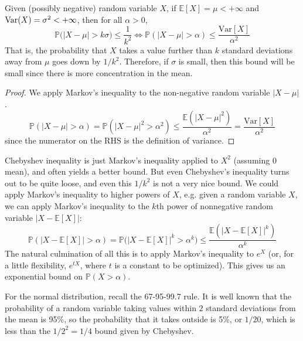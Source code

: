   \begin{theorem}
    Given (possibly negative) random variable $X$, if $\mathbb{E}[X] = \mu < +\infty$ and $\Var(X) = \sigma^2 < +\infty$, then for all $\alpha > 0$, 
    \begin{equation}
      \mathbb{P} \big( |X - \mu| > k \sigma \big) \leq \frac{1}{k^2} \iff \mathbb{P}(|X - \mu| > \alpha) \leq \frac{\mathrm{Var}[X]}{\alpha^2}
    \end{equation}
    That is, the probability that $X$ takes a value further than $k$ standard deviations away from $\mu$ goes down by $1/k^2$. Therefore, if $\sigma$ is small, then this bound will be small since there is more concentration in the mean. 
  \end{theorem}
  \begin{proof}
    We apply Markov's inequality to the non-negative random variable $|X - \mu|$. 
    \begin{equation}
      \mathbb{P}(|X - \mu| > \alpha) = \mathbb{P}(|X - \mu|^2 > \alpha^2) \leq \frac{\mathbb{E}(|X - \mu|^2)}{\alpha^2} = \frac{\mathrm{Var}[X]}{\alpha^2}
    \end{equation}
    since the numerator on the RHS is the definition of variance. 
  \end{proof}

  Chebyshev inequality is just Markov's inequality applied to $X^2$ (assuming $0$ mean), and often yields a better bound. But even Chebyshev's inequality turns out to be quite loose, and even this $1/k^2$ is not a very nice bound. We could apply Markov's inequality to higher powers of $X$, e.g. given a random variable $X$, we can apply Markov's inequality to the $k$th power of nonnegative random variable $|X - \mathbb{E}[X]|$: 
  \begin{equation}
    \mathbb{P} (|X - \mathbb{E}[X] | > \alpha) = \mathbb{P}\big( |X - \mathbb{E}[X] |^k > \alpha^k \big) \leq \frac{\mathbb{E}( |X - \mathbb{E}[X] |^k )}{\alpha^k}
  \end{equation}
  The natural culmination of all this is to apply Markov's inequality to $e^X$ (or, for a little flexibility, $e^{t X}$, where $t$ is a constant to be optimized). This gives us an exponential bound on $\mathbb{P}(X > \alpha)$. 

  \begin{example}[Gaussian]
    For the normal distribution, recall the 67-95-99.7 rule. It is well known that the probability of a random variable taking values within $2$ standard deviations from the mean is 95\%, so the probability that it takes outside is 5\%, or $1/20$, which is less than the $1/2^2 = 1/4$ bound given by Chebyshev. 
  \end{example}

